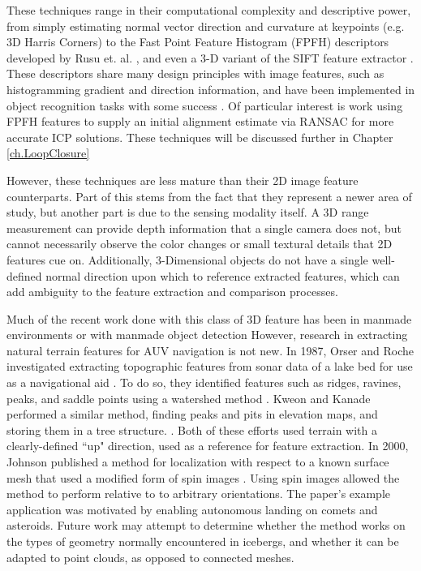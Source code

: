 These techniques range in their computational complexity and descriptive power, from simply estimating normal vector direction and curvature at keypoints (e.g. 3D Harris Corners) to the Fast Point Feature Histogram (FPFH) descriptors developed by Rusu et. al. \cite{Rusu2009}, and even a 3-D variant of the SIFT feature extractor \cite{Scovanner2007}. These descriptors share many design principles with image features, such as histogramming gradient and direction information, and have been implemented in object recognition tasks with some success \cite{Rusu2009}. Of particular interest is work using FPFH features to supply an initial alignment estimate via RANSAC for more accurate ICP solutions. These techniques will be discussed further in Chapter \ref{ch.LoopClosure}

However, these techniques are less mature than their 2D image feature counterparts. Part of this stems from the fact that they represent a newer area of study, but another part is due to the sensing modality itself. A 3D range measurement  can provide depth information that a single camera does not, but cannot necessarily observe the color changes or small textural details that 2D features cue on. Additionally, 3-Dimensional objects do not have a single well-defined normal direction upon which to reference extracted features, which can add ambiguity to the feature extraction and comparison processes. 

Much of the recent work done with this class of 3D feature has been in manmade environments or with manmade object detection \cite{Rusu2008,Rusu2011,Koppula2011} However, research in extracting natural terrain features for AUV navigation is not new. In 1987, Orser and Roche investigated extracting topographic features from sonar data of a lake bed for use as a navigational aid \cite{Orser1987}. To do so, they identified features such as ridges, ravines, peaks, and saddle points using a watershed method \cite{Sonka2014}. Kweon and Kanade performed a similar method, finding peaks and pits in elevation maps, and storing them in a tree structure. \cite{Kweon1994}. Both of these efforts used terrain with a clearly-defined ``up" direction, used as a reference for feature extraction. In 2000, Johnson published a method for localization with respect to a known surface mesh that used a modified form of spin images \cite{Johnson1999,Johnson2000}. Using spin images allowed the method to perform relative to to arbitrary orientations. The paper's example application was motivated by enabling autonomous landing on comets and asteroids. Future work may attempt to determine whether the method works on the types of geometry normally encountered in icebergs, and whether it can be adapted to point clouds, as opposed to connected meshes. 

